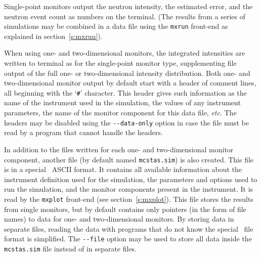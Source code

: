 Single-point monitors output the neutron intensity, the estimated
error, and the neutron event count as numbers on the
terminal. (The results from a series of simulations may be combined in a
data file using the \verb+mxrun+ front-end as explained in
section~\ref{s:mxrun}).

When using one- and two-dimensional monitors, the integrated
intensities are written to terminal as for the single-point monitor
type, supplementing file output of the full one- or two-dimensional
intensity distribution. Both one- and two-dimensional monitor output by default start with a
header of comment lines, all beginning with the `\verb+#+' character.
This header gives such information as the name of the instrument used in
the simulation, the values of any instrument parameters, the name of the
monitor component for this data file, \textit{etc}. The headers may be
disabled using the \verb+--data-only+ option in case the file must be
read by a program that cannot handle the headers.

In addition to the files written for each one- and two-dimensional
monitor component, another file (by default named \verb+mcstas.sim+) is
also created. This file is in a special \MCX\ ASCII format. It contains
all available information about the instrument definition used for the
simulation, the parameters and options used to run the simulation, and
the monitor components present in the instrument. It is read by the
\verb+mxplot+ front-end (see section~\ref{s:mxplot}). This file stores
the results from single monitors, but by default contains only pointers
(in the form of file names) to data for one- and two-dimensional
monitors. By storing data in separate files, reading the data with
programs that do not know the special \MCX\ file format is
simplified. The \verb+--file+ option may be used to store all data
inside the \verb+mcstas.sim+ file instead of in separate files.

